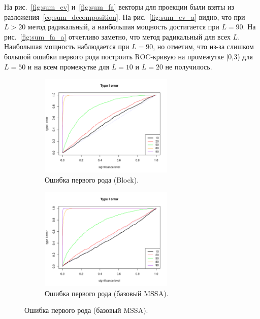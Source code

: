 \documentclass[specialist,
substylefile = spbu_report.rtx,
subf,href,colorlinks=true, 12pt]{disser}
\theoremstyle{definition}
\begin{document}
На рис.~\ref{fig:sum_ev} и~\ref{fig:sum_fa} векторы для проекции были взяты из разложения~\eqref{eq:sum_decomposition}. На рис.~\ref{fig:sum_ev_a} видно, что при $L>20$ метод радикальный, а наибольшая мощность достигается при $L=90$. На рис.~\ref{fig:sum_fa_a} отчетливо заметно, что метод радикальный для всех $L$. Наибольшая мощность наблюдается при $L=90$, но отметим, что из-за слишком большой ошибки первого рода построить ROC-кривую на промежутке [0,3) для $L=50$ и на всем промежутке для $L=10$ и $L=20$ не получилось.
\begin{figure}[h!]
	\captionsetup[subfigure]{justification=Centering}
	\begin{subfigure}[t]{0.45\textwidth}
		\centering
		\includegraphics[width=0.7\textwidth]{img/type1error_block_ev.pdf}
		\caption{Ошибка первого рода (Block).}
		\label{fig:block_ev_a}
	\end{subfigure}\hspace{\fill}
	\begin{subfigure}[t]{0.45\textwidth}
		\centering
		\includegraphics[width=0.7\textwidth]{img/type1error_mssa_ev.pdf}
		\caption{Ошибка первого рода (базовый MSSA).}
	\end{subfigure}

\end{figure}
\end{document}
